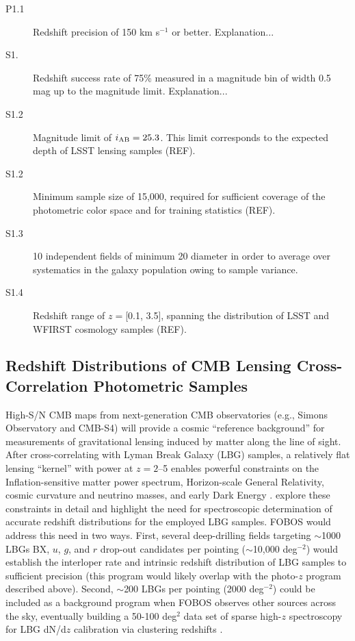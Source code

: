 \documentclass[preprint,11pt]{aastex}
\newcommand{\kms}{{\rm km s$^{-1}$}}
\begin{document}
\begin{description}

\item[P1.1] Redshift precision of 150 \kms{} or better.  Explanation...

\item[S1.]  Redshift success rate of 75\% measured in a magnitude bin of width 0.5 mag up to the magnitude limit.  Explanation...

\item[S1.2] Magnitude limit of $i_{\rm AB} = 25.3$.  This limit corresponds to the expected depth of LSST lensing samples (REF).

\item[S1.2] Minimum sample size of 15,000, required for sufficient coverage of the photometric color space and for training statistics (REF).

\item[S1.3] 10 independent fields of minimum 20\arcmin{} diameter in order to average over systematics in the galaxy population owing to sample variance.

\item[S1.4] Redshift range of $z = $[0.1, 3.5], spanning the distribution of LSST and WFIRST cosmology samples (REF).

\end{description}



\subsection{Redshift Distributions of CMB Lensing Cross-Correlation Photometric Samples}

High-S/N CMB maps from next-generation CMB observatories (e.g., Simons Observatory and CMB-S4) will provide a cosmic
``reference background'' for measurements of gravitational lensing induced by matter along the line of sight.  After
cross-correlating with Lyman Break Galaxy (LBG) samples, a relatively flat lensing ``kernel'' with power at $z = 2$--5
enables powerful constraints on the Inflation-sensitive matter power spectrum, Horizon-scale General Relativity, cosmic
curvature and neutrino masses, and early Dark Energy \citep{ferraro19}.  \citet{wilson19} explore these constraints in
detail and highlight the need for spectroscopic determination of accurate redshift distributions for the employed LBG
samples. FOBOS would address this need in two ways.  First, several deep-drilling fields targeting $\sim$1000 LBGs BX,
$u$, $g$, and $r$ drop-out candidates per pointing ($\sim$10,000 deg$^{-2}$) would establish the interloper rate and
intrinsic redshift distribution of LBG samples to sufficient precision (this program would likely overlap with the
photo-$z$ program described above).  Second, $\sim$200 LBGs per pointing (2000 deg$^{-2}$) could be included as a
background program when FOBOS observes other sources across the sky, eventually building a 50-100 deg$^2$ data set of
sparse high-$z$ spectroscopy for LBG dN/d$z$ calibration via clustering redshifts \citep[see][]{wilson19}.
\end{document}
